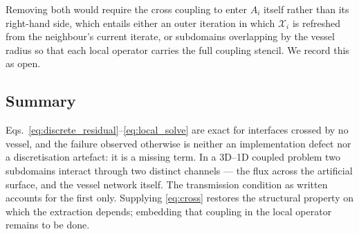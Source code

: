Removing both would require the cross coupling to enter $A_i$ itself rather than
its right-hand side, which entails either an outer iteration in which
$\mathcal{X}_i$ is refreshed from the neighbour's current iterate, or subdomains
overlapping by the vessel radius so that each local operator carries the full
coupling stencil. We record this as open.

\subsection{Summary}

Eqs.~\eqref{eq:discrete_residual}--\eqref{eq:local_solve} are exact for interfaces
crossed by no vessel, and the failure observed otherwise is neither an
implementation defect nor a discretisation artefact: it is a missing term. In a
3D--1D coupled problem two subdomains interact through two distinct channels ---
the flux across the artificial surface, and the vessel network itself. The
transmission condition as written accounts for the first only. Supplying
\eqref{eq:cross} restores the structural property on which the extraction
depends; embedding that coupling in the local operator remains to be done.
